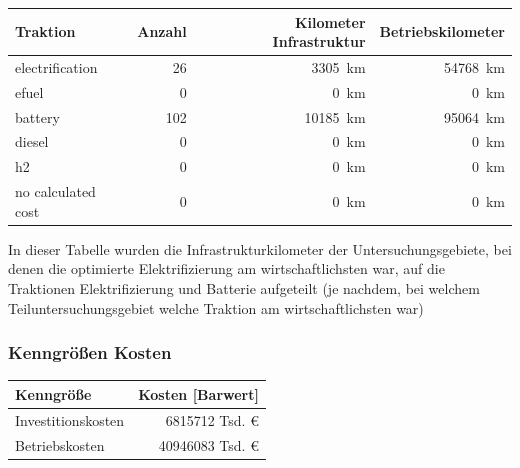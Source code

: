 \begin{center}
	\begin{tabularx}{\textwidth}{X | r | r | r} Traktion & Anzahl & Kilometer Infrastruktur & Betriebskilometer \\
	\hline
            electrification & \num{26} &  \SI{3305}{\km} & \SI{54768}{\km}\\
            efuel & \num{0} &  \SI{0}{\km} & \SI{0}{\km}\\
            battery & \num{102} &  \SI{10185}{\km} & \SI{95064}{\km}\\
            diesel & \num{0} &  \SI{0}{\km} & \SI{0}{\km}\\
            h2 & \num{0} &  \SI{0}{\km} & \SI{0}{\km}\\
            no calculated cost & \num{0} &  \SI{0}{\km} & \SI{0}{\km}\\
    	\end{tabularx}
\end{center}
In dieser Tabelle wurden die Infrastrukturkilometer der Untersuchungsgebiete, bei denen die optimierte Elektrifizierung am wirtschaftlichsten war, auf die Traktionen Elektrifizierung und Batterie aufgeteilt (je nachdem, bei welchem Teiluntersuchungsgebiet welche Traktion am wirtschaftlichsten war)

\subsubsection{Kenngrößen Kosten}

\begin{center}
	\begin{tabularx}{\textwidth}{X | r } Kenngröße & Kosten [Barwert] \\
	\hline
	Investitionskosten & \num{6815712} Tsd. €\\
	Betriebskosten & \num{40946083} Tsd. €
	\end{tabularx}
\end{center}

